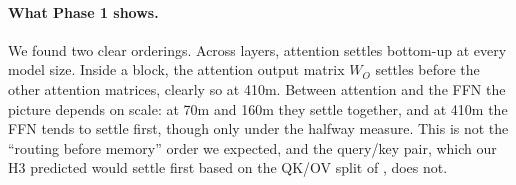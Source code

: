 \documentclass[11pt]{article}
\newcommand{\Wv}{W_V}
\newcommand{\Wo}{W_O}
\begin{document}


\paragraph{What Phase 1 shows.} We found two clear orderings. Across layers,
attention settles bottom-up at every model size. Inside a block, the attention
output matrix $\Wo$ settles before the other attention matrices, clearly so at
410m. Between attention and the FFN the picture depends on scale: at 70m and
160m they settle together, and at 410m the FFN tends to settle first, though
only under the halfway measure. This is not the ``routing before memory''
order we expected, and the query/key pair, which our H3 predicted would settle
first based on the QK/OV split of \citet{elhage2021framework}, does not.
\end{document}
